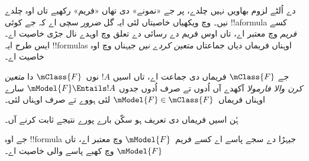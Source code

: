 \documentclass[../../../include/open-logic-section]{subfiles}
\begin{document}


 دے اُلٹے لزوم بھاویں نہیں چلدے، پر جے «نمونے» دی تھاں «فریم» رکھیے تاں اوہ چلدے نیں۔  وچ ویکھیاں خاصیتاں لئی ایہ گل \emph{ضرور} سچی اے کہ جے کوئی !!a{formula} کسے \emph{فریم} وچ معتبر اے، تاں اوس فریم دے رسائی دے تعلق وچ اوہدے نال جڑی خاصیت اے۔ ایس طرح ایہ !!{formula}s اوہناں فریماں دیاں جماعتاں \emph{متعین کردے نیں} جیہناں وچ اوہ خاصیت اے۔

\begin{defn}
  جے $\mClass{F}$ فریماں دی جماعت اے، تاں اسیں $!A$ نوں~$\mClass{F}$ دا \emph{متعین کرن والا فارمولا} آکھدے آں اُدوں تے صرف اُدوں جدوں $\mModel{F} \Entails !A$ سارے اوہناں فریماں~$\mModel{F} \in \mClass{F}$ لئی ہووے تے صرف اوہناں لئی۔
\end{defn}

ہُن اسیں فریماں دی تعریف ہو سکّن بارے پورے نتیجے ثابت کرنے آں۔

\begin{thm}
جے اوہ !!{formula} جیہڑا  دے سجے پاسے اے کسے فریم~$\mModel{F}$ وچ معتبر اے، تاں $\mModel{F}$ وچ کھبے پاسے والی خاصیت اے۔
\end{thm}
\end{document}
